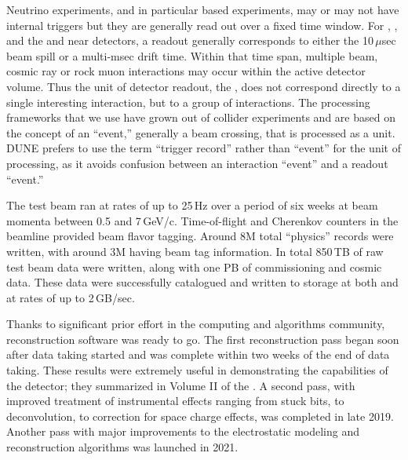 \documentclass[../main-v1.tex]{subfiles}
\begin{document}

Neutrino experiments, and in particular  based experiments, may or may not have internal triggers but they are generally read out over a fixed time window.  For , ,  and the  and  near detectors, a readout generally corresponds to either the 10\,$\mu$sec beam spill or a multi-msec  drift time.  Within that time span, multiple beam, cosmic ray or rock muon interactions may occur within the active detector volume.  Thus the unit of detector readout, the , does not correspond directly to a single interesting interaction, but to a group of interactions. The processing frameworks that we use have grown out of collider experiments and are based on the concept of an ``event,'' generally a beam crossing, that is processed as a unit.  DUNE prefers to use the term ``trigger record'' rather than ``event'' for the unit of processing, as it avoids confusion between an interaction ``event'' and a readout ``event.''  


The test beam ran at rates of up to 25\,Hz over a period of six weeks at beam momenta between 0.5 and 7\,GeV/c.  Time-of-flight and Cherenkov counters in the beamline provided beam flavor tagging.  Around 8M total ``physics'' records were written, with around 3M having beam tag information.  In total  850\,TB of raw test beam data were written, along with one PB of commissioning and cosmic data. These data were successfully catalogued and written to storage at both  and  at rates of up to 2\,GB/sec.   

Thanks to significant prior effort in the   computing and algorithms community, reconstruction software was ready to go. The first reconstruction pass began soon after data taking started and was complete within two weeks of the end of data taking.  These results were extremely useful in demonstrating the capabilities of the detector; they summarized in Volume II of the  \cite{Abi:2020evt}.  A second pass, with improved treatment of instrumental effects ranging from stuck bits, to \twod deconvolution, to correction for space charge effects, was completed in late 2019. Another pass with major improvements to the electrostatic modeling and reconstruction algorithms was launched in 2021. 
\end{document}
